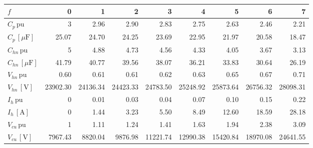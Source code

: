 \begin{tabular}{lrrrrrrrr}
\toprule
$f$ & 0 & 1 & 2 & 3 & 4 & 5 & 6 & 7 \\
\midrule
$C_p \, \mathrm{pu}$ & 3 & 2.96 & 2.90 & 2.83 & 2.75 & 2.63 & 2.46 & 2.21 \\
$C_p \, [\mu\mathrm{F}]$ & 25.07 & 24.70 & 24.25 & 23.69 & 22.95 & 21.97 & 20.58 & 18.47 \\
$C_{hn} \, \mathrm{pu}$ & 5 & 4.88 & 4.73 & 4.56 & 4.33 & 4.05 & 3.67 & 3.13 \\
$C_{hn} \, [\mu\mathrm{F}]$ & 41.79 & 40.77 & 39.56 & 38.07 & 36.21 & 33.83 & 30.64 & 26.19 \\
$V_{hn} \, \mathrm{pu}$ & 0.60 & 0.61 & 0.61 & 0.62 & 0.63 & 0.65 & 0.67 & 0.71 \\
$V_{hn} \, [\mathrm{V}]$ & 23902.30 & 24136.34 & 24423.33 & 24783.50 & 25248.92 & 25873.64 & 26756.32 & 28098.31 \\
$I_{h} \, \mathrm{pu}$ & 0 & 0.01 & 0.03 & 0.04 & 0.07 & 0.10 & 0.15 & 0.22 \\
$I_{h} \, [\mathrm{A}]$ & 0 & 1.44 & 3.23 & 5.50 & 8.49 & 12.60 & 18.59 & 28.18 \\
$V_{cu} \, \mathrm{pu}$ & 1 & 1.11 & 1.24 & 1.41 & 1.63 & 1.94 & 2.38 & 3.09 \\
$V_{cu} \, [\mathrm{V}]$ & 7967.43 & 8820.04 & 9876.98 & 11221.74 & 12990.38 & 15420.84 & 18970.08 & 24641.55 \\
\bottomrule
\end{tabular}